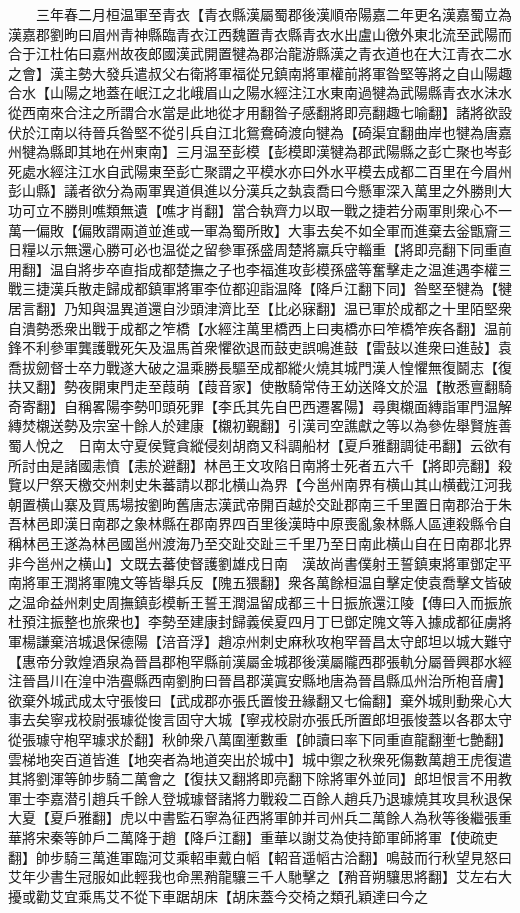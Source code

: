 　　三年春二月桓温軍至青衣【青衣縣漢屬蜀郡後漢順帝陽嘉二年更名漢嘉蜀立為漢嘉郡劉昫曰眉州青神縣臨青衣江西魏置青衣縣青衣水出盧山徼外東北流至武陽而合于江杜佑曰嘉州故夜郎國漢武開置犍為郡治龍游縣漢之青衣道也在大江青衣二水之會】漢主勢大發兵遣叔父右衛將軍福從兄鎮南將軍權前將軍昝堅等將之自山陽趣合水【山陽之地蓋在岷江之北峨眉山之陽水經注江水東南過犍為武陽縣青衣水沬水從西南來合注之所謂合水當是此地從才用翻昝子感翻將即亮翻趣七喻翻】諸將欲設伏於江南以待晉兵昝堅不從引兵自江北鴛鴦碕渡向犍為【碕渠宜翻曲岸也犍為唐嘉州犍為縣即其地在州東南】三月温至彭模【彭模即漢犍為郡武陽縣之彭亡聚也岑彭死處水經注江水自武陽東至彭亡聚謂之平模水亦曰外水平模去成都二百里在今眉州彭山縣】議者欲分為兩軍異道俱進以分漢兵之埶袁喬曰今懸軍深入萬里之外勝則大功可立不勝則噍類無遺【噍才肖翻】當合執齊力以取一戰之捷若分兩軍則衆心不一萬一偏敗【偏敗謂兩道並進或一軍為蜀所敗】大事去矣不如全軍而進棄去釡甑齎三日糧以示無還心勝可必也温從之留參軍孫盛周楚將羸兵守輜重【將即亮翻下同重直用翻】温自將步卒直指成都楚撫之子也李福進攻彭模孫盛等奮擊走之温進遇李權三戰三捷漢兵散走歸成都鎮軍將軍李位都迎詣温降【降戶江翻下同】昝堅至犍為【犍居言翻】乃知與温異道還自沙頭津濟比至【比必寐翻】温已軍於成都之十里陌堅衆自潰勢悉衆出戰于成都之笮橋【水經注萬里橋西上曰夷橋亦曰笮橋笮疾各翻】温前鋒不利參軍龔護戰死矢及温馬首衆懼欲退而鼓吏誤鳴進鼓【雷鼔以進衆曰進鼔】袁喬拔劒督士卒力戰遂大破之温乘勝長驅至成都縱火燒其城門漢人惶懼無復鬬志【復扶又翻】勢夜開東門走至葭萌【葭音家】使散騎常侍王幼送降文於温【散悉亶翻騎奇寄翻】自稱畧陽李勢叩頭死罪【李氏其先自巴西遷畧陽】尋輿櫬面縳詣軍門温解縳焚櫬送勢及宗室十餘人於建康【櫬初覲翻】引漢司空譙獻之等以為參佐舉賢旌善蜀人悅之　日南太守夏侯覽貪縱侵刻胡商又科調船材【夏戶雅翻調徒弔翻】云欲有所討由是諸國恚憤【恚於避翻】林邑王文攻陷日南將士死者五六千【將即亮翻】殺覽以尸祭天檄交州刺史朱蕃請以郡北横山為界【今邕州南界有横山其山横截江河我朝置横山寨及買馬場按劉昫舊唐志漢武帝開百越於交趾郡南三千里置日南郡治于朱吾林邑即漢日南郡之象林縣在郡南界四百里後漢時中原喪亂象林縣人區連殺縣令自稱林邑王遂為林邑國邕州渡海乃至交趾交趾三千里乃至日南此横山自在日南郡北界非今邕州之横山】文既去蕃使督護劉雄戍日南　漢故尚書僕射王誓鎮東將軍鄧定平南將軍王潤將軍隗文等皆舉兵反【隗五猥翻】衆各萬餘桓温自擊定使袁喬擊文皆破之温命益州刺史周撫鎮彭模斬王誓王潤温留成都三十日振旅還江陵【傳曰入而振旅杜預注振整也旅衆也】李勢至建康封歸義侯夏四月丁巳鄧定隗文等入據成都征虜將軍楊謙棄涪城退保德陽【涪音浮】趙凉州刺史麻秋攻枹罕晉昌太守郎坦以城大難守【惠帝分敦煌酒泉為晉昌郡枹罕縣前漢屬金城郡後漢屬隴西郡張軌分屬晉興郡水經注晉昌川在湟中浩亹縣西南劉朐曰晉昌郡漢寘安縣地唐為晉昌縣瓜州治所枹音膚】欲棄外城武成太守張悛曰【武成郡亦張氏置悛丑緣翻又七倫翻】棄外城則動衆心大事去矣寧戎校尉張璩從悛言固守大城【寧戎校尉亦張氏所置郎坦張悛蓋以各郡太守從張璩守枹罕璩求於翻】秋帥衆八萬圍壍數重【帥讀曰率下同重直龍翻壍七艶翻】雲梯地突百道皆進【地突者為地道突出於城中】城中禦之秋衆死傷數萬趙王虎復遣其將劉渾等帥步騎二萬會之【復扶又翻將即亮翻下除將軍外並同】郎坦恨言不用教軍士李嘉潜引趙兵千餘人登城璩督諸將力戰殺二百餘人趙兵乃退璩燒其攻具秋退保大夏【夏戶雅翻】虎以中書監石寧為征西將軍帥并司州兵二萬餘人為秋等後繼張重華將宋秦等帥戶二萬降于趙【降戶江翻】重華以謝艾為使持節軍師將軍【使疏吏翻】帥步騎三萬進軍臨河艾乘軺車戴白幍【軺音遥幍古洽翻】鳴鼓而行秋望見怒曰艾年少書生冠服如此輕我也命黑矟龍驤三千人馳擊之【矟音朔驤思將翻】艾左右大擾或勸艾宜乘馬艾不從下車踞胡床【胡床蓋今交椅之類孔穎達曰今之